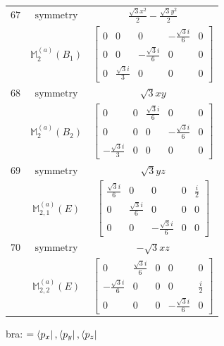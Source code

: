 \documentclass[fleqn,8pt,landscape]{jsarticle}
\begin{document}
\begin{longtable}{ccc}
$ 67 $ & $ \text{symmetry} $ & $ \frac{\sqrt{3} x^{2}}{2} - \frac{\sqrt{3} y^{2}}{2} $ \\
$  $ & $ \mathbb{M}_{2}^{(a)}(B_{1}) $ & $ \begin{bmatrix} 0 & 0 & 0 & - \frac{\sqrt{3} i}{6} & 0 \\ 0 & 0 & - \frac{\sqrt{3} i}{6} & 0 & 0 \\ 0 & \frac{\sqrt{3} i}{3} & 0 & 0 & 0 \end{bmatrix} $ \\ \hline
$ 68 $ & $ \text{symmetry} $ & $ \sqrt{3} x y $ \\
$  $ & $ \mathbb{M}_{2}^{(a)}(B_{2}) $ & $ \begin{bmatrix} 0 & 0 & \frac{\sqrt{3} i}{6} & 0 & 0 \\ 0 & 0 & 0 & - \frac{\sqrt{3} i}{6} & 0 \\ - \frac{\sqrt{3} i}{3} & 0 & 0 & 0 & 0 \end{bmatrix} $ \\ \hline
$ 69 $ & $ \text{symmetry} $ & $ \sqrt{3} y z $ \\
$  $ & $ \mathbb{M}_{2,1}^{(a)}(E) $ & $ \begin{bmatrix} \frac{\sqrt{3} i}{6} & 0 & 0 & 0 & \frac{i}{2} \\ 0 & \frac{\sqrt{3} i}{6} & 0 & 0 & 0 \\ 0 & 0 & - \frac{\sqrt{3} i}{6} & 0 & 0 \end{bmatrix} $ \\ \hline
$ 70 $ & $ \text{symmetry} $ & $ - \sqrt{3} x z $ \\
$  $ & $ \mathbb{M}_{2,2}^{(a)}(E) $ & $ \begin{bmatrix} 0 & \frac{\sqrt{3} i}{6} & 0 & 0 & 0 \\ - \frac{\sqrt{3} i}{6} & 0 & 0 & 0 & \frac{i}{2} \\ 0 & 0 & 0 & - \frac{\sqrt{3} i}{6} & 0 \end{bmatrix} $ \\ \hline
\end{longtable}
bra: $=\bra{p_{x}}, \bra{p_{y}}, \bra{p_{z}}$
\end{document}
